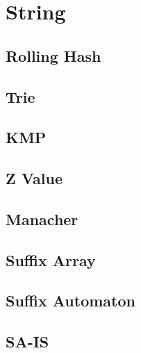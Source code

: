 \documentclass[a4paper,10pt,twocolumn,oneside]{article}
\begin{document}
\section{String}

\subsection{Rolling Hash}


\subsection{Trie}


\subsection{KMP}


\subsection{Z Value}


\subsection{Manacher}


% 

\subsection{Suffix Array}


\subsection{Suffix Automaton}


\subsection{SA-IS}

\end{document}
